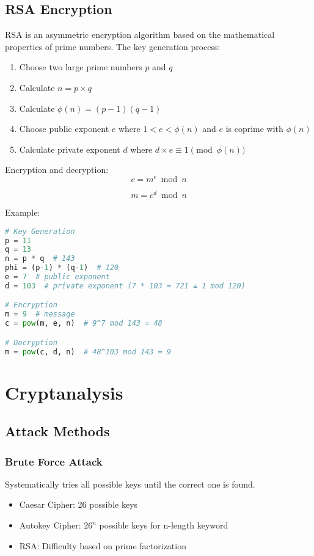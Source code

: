 \documentclass[12pt,a4paper]{article}
\begin{document}
\subsection{RSA Encryption}
RSA is an asymmetric encryption algorithm based on the mathematical properties of prime numbers. The key generation process:

\begin{enumerate}
    \item Choose two large prime numbers $p$ and $q$
    \item Calculate $n = p \times q$
    \item Calculate $\phi(n) = (p-1)(q-1)$
    \item Choose public exponent $e$ where $1 < e < \phi(n)$ and $e$ is coprime with $\phi(n)$
    \item Calculate private exponent $d$ where $d \times e \equiv 1 \pmod{\phi(n)}$
\end{enumerate}

Encryption and decryption:
\begin{equation}
c = m^e \bmod n
\end{equation}

\begin{equation}
m = c^d \bmod n
\end{equation}

Example:
\begin{lstlisting}[language=Python]
# Key Generation
p = 11
q = 13
n = p * q  # 143
phi = (p-1) * (q-1)  # 120
e = 7  # public exponent
d = 103  # private exponent (7 * 103 = 721 ≡ 1 mod 120)

# Encryption
m = 9  # message
c = pow(m, e, n)  # 9^7 mod 143 = 48

# Decryption
m = pow(c, d, n)  # 48^103 mod 143 = 9
\end{lstlisting}

\section{Cryptanalysis}

\subsection{Attack Methods}

\subsubsection{Brute Force Attack}
Systematically tries all possible keys until the correct one is found.
\begin{itemize}
    \item Caesar Cipher: 26 possible keys
    \item Autokey Cipher: $26^n$ possible keys for n-length keyword
    \item RSA: Difficulty based on prime factorization
\end{itemize}
\end{document}
